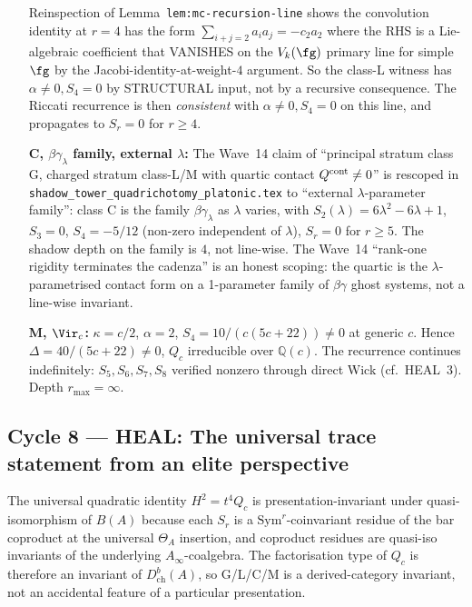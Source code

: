 \begin{itemize}
  Reinspection of Lemma~\texttt{lem:mc-recursion-line} shows the
  convolution identity at $r = 4$ has the form $\sum_{i+j = 2} a_i a_j =
  -c_2 a_2$ where the RHS is a Lie-algebraic coefficient that VANISHES on
  the $V_k(\fg)$ primary line for simple $\fg$ by the
  Jacobi-identity-at-weight-$4$ argument. So the class-L witness has
  $\alpha \ne 0, S_4 = 0$ by STRUCTURAL input, not by a recursive
  consequence. The Riccati recurrence is then \emph{consistent} with
  $\alpha \ne 0, S_4 = 0$ on this line, and propagates to $S_r = 0$ for
  $r \ge 4$.
\item[\textbf{C, $\beta\gamma_\lambda$ family, external $\lambda$:}] The
  Wave~14 claim of ``principal stratum class G, charged stratum class-L/M
  with quartic contact $Q^{\rm cont} \ne 0$'' is rescoped in
  \texttt{shadow\_tower\_quadrichotomy\_platonic.tex} to ``external
  $\lambda$-parameter family'': class C is the family
  $\beta\gamma_\lambda$ as $\lambda$ varies, with $S_2(\lambda) = 6\lambda^2
  - 6\lambda + 1$, $S_3 = 0$, $S_4 = -5/12$ (non-zero independent of
  $\lambda$), $S_r = 0$ for $r \ge 5$. The shadow depth on the family is
  $4$, not line-wise. The Wave~14 ``rank-one rigidity terminates the
  cadenza'' is an honest scoping: the quartic is the
  $\lambda$-parametrised contact form on a 1-parameter family of
  $\beta\gamma$ ghost systems, not a line-wise invariant.
\item[\textbf{M, $\Vir_c$:}] $\kappa = c/2$, $\alpha = 2$, $S_4 = 10/(c(5c+22))
  \ne 0$ at generic $c$. Hence $\Delta = 40/(5c+22) \ne 0$, $Q_c$ irreducible
  over $\mathbb Q(c)$. The recurrence continues indefinitely: $S_5, S_6,
  S_7, S_8$ verified nonzero through direct Wick (cf.\ HEAL~3). Depth
  $r_{\max} = \infty$.
\end{itemize}

\subsection*{Cycle 8 --- HEAL: The universal trace statement from an elite perspective}

The universal quadratic identity $H^2 = t^4 Q_c$ is presentation-invariant
under quasi-isomorphism of $B(A)$ because each $S_r$ is a
$\mathrm{Sym}^r$-coinvariant residue of the bar coproduct at the universal
$\Theta_A$ insertion, and coproduct residues are quasi-iso invariants of
the underlying $A_\infty$-coalgebra. The factorisation type of $Q_c$ is
therefore an invariant of $D^b_{\mathrm{ch}}(A)$, so G/L/C/M is a
derived-category invariant, not an accidental feature of a particular
presentation.

